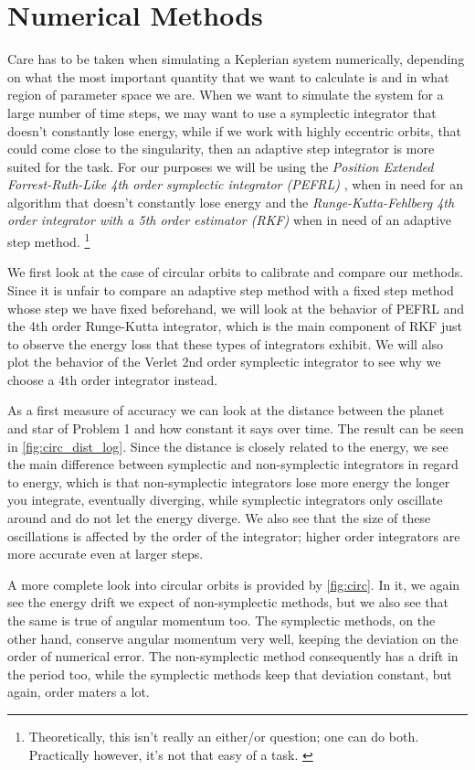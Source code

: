 \documentclass[10pt,a4paper,twocolumn]{article}
\begin{document}
\section{Numerical Methods}

Care has to be taken when simulating a Keplerian system numerically, depending on what the most important quantity that we want to calculate is and in what region of parameter space we are. When we want to simulate the system for a large number of time steps, we may want to use a symplectic integrator that doesn't constantly lose energy, while if we work with highly eccentric orbits, that could come close to the singularity, then an adaptive step integrator is more suited for the task. For our purposes we will be using the \emph{Position Extended Forrest-Ruth-Like 4th order symplectic integrator (PEFRL)} \cite{Omelyan_2002}, when in need for an algorithm that doesn't constantly lose energy and the \emph{Runge-Kutta-Fehlberg 4th order integrator with a 5th order estimator (RKF)} when in need of an adaptive step method. \footnote{Theoretically, this isn't really an either/or question; one can do both. Practically however, it's not that easy of a task. \cite{Richardson_2011}}

We first look at the case of circular orbits to calibrate and compare our methods. Since it is unfair to compare an adaptive step method with a fixed step method whose step we have fixed beforehand, we will look at the behavior of PEFRL and the 4th order Runge-Kutta integrator, which is the main component of RKF just to observe the energy loss that these types of integrators exhibit. We will also plot the behavior of the Verlet 2nd order symplectic integrator to see why we choose a 4th order integrator instead.

As a first measure of accuracy we can look at the distance between the planet and star of Problem 1 and how constant it says over time. The result can be seen in \cref{fig:circ_dist_log}. Since the distance is closely related to the energy, we see the main difference between symplectic and non-symplectic integrators in regard to energy, which is that non-symplectic integrators lose more energy the longer you integrate, eventually diverging, while symplectic integrators only oscillate around and do not let the energy diverge. We also see that the size of these oscillations is affected by the order of the integrator; higher order integrators are more accurate even at larger steps.

A more complete look into circular orbits is provided by \cref{fig:circ}. In it, we again see the energy drift we expect of non-symplectic methods, but we also see that the same is true of angular momentum too. The symplectic methods, on the other hand, conserve angular momentum very well, keeping the deviation on the order of numerical error. The non-symplectic method consequently has a drift in the period too, while the symplectic methods keep that deviation constant, but again, order maters a lot.
\end{document}
